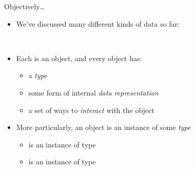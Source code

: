 \documentclass[pdf, aspectratio=169, 12pt]{beamer}
\begin{document}
\begin{frame}{Objectively\ldots}
	\begin{itemize}
		\item<+-> We've discussed many different kinds of data so far:
			\begin{center}
				\hspace{1cm}\hspace{1cm}\hspace{1cm}\pyi{[2,4,6]}\\
				\hspace{1cm}\hspace{1cm}
			\end{center}
			\vspace{5mm}
		\item<+-> Each is an \alert{object}, and every object has:
			\begin{itemize}
				\item a \emph{type}
				\item some form of internal \emph{data representation}
				\item a set of ways to \emph{interact} with the object
			\end{itemize}
		\item<+-> More particularly, an object is an \alert{instance} of some \emph{type}
			\begin{itemize}
				\item {} is an instance of type 
				\item {} is an instance of type 
			\end{itemize}
	\end{itemize}
\end{frame}
\end{document}
